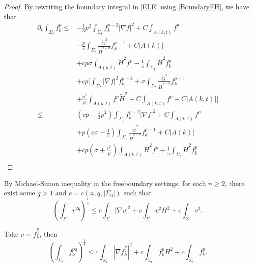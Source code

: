 \begin{proof}
    By rewriting the boundary integral in \autoref{ELE} using \autoref{BoundaryFH}, we have that
    \begin{equation}
        \begin{split}
            \partial_t \int_{\Sigma_t} f_k^p
        \leq &  -\frac{1}{3}p^2 \int_{\Sigma_t} f_{k}^{p-2}\left| \nabla f \right| ^2+C \int_{A(k,t)} f^p  \\
        &-\frac{p}{c} \int_{\Sigma_t} \frac{\tilde{G}^2}{\tilde{H}^{2-\sigma }}f_{k}^{p-1}+C \left| A(k) \right|\\
        &+cp \sigma \int_{A(k,t)}^{}\tilde{H}^2f^p-\frac{1}{5}\int_{\Sigma_t} \tilde{H}^2f_{k}^{p} \\
        &+cp \bigg[  \int_{\Sigma_t} \left| \nabla f \right| ^2 f_{k}^{p-2} + \sigma \int_{\Sigma_t} \frac{\tilde{G}^{2} }{\tilde{H}^{2-\sigma } } f_{k}^{p-1} \\
        &+ \frac{p^2}{\mu }\int_{A(k,t)}^{}f^p \tilde{H}^{2} + C \int_{A(k,t)}^{}f^p + C \left| A(k,t) \right|\bigg]\\
        \leq & \left( cp-\frac{1}{3}p^2 \right) \int_{\Sigma_t} f_{k}^{p-2}\left| \nabla f \right| ^2+C \int_{A(k,t)} f^p  \\
        &+ p\left( c\sigma - \frac{1}{c} \right) \int_{\Sigma_t} \frac{\tilde{G}^2}{\tilde{H}^{2-\sigma }}f_{k}^{p-1}+C \left| A(k) \right|\\
        &+ cp\left(  \sigma + \frac{p^2}{\mu } \right) \int_{A(k,t)}^{}\tilde{H}^2f^p-\frac{1}{5}\int_{\Sigma_t} \tilde{H}^2f_{k}^{p}\\
        \end{split}
        \end{equation}
\end{proof}

By Michael-Simon inequality in the freeboundary settings, for each $n \geq 2$, there exist some $q>1$ and $c=c(n,q,\left| \Sigma_0 \right| )$ such that
\[\left( \int_{\Sigma} v^{2q} \right) ^{\frac{1}{q}} \leq c \int_{\Sigma} \left| \nabla v \right| ^2 + c \int_{\Sigma} v^2 H^2 + c \int_{\Sigma} v^2.\]

Take $v=f_{k}^{\frac{p}{2}} $, then
\begin{equation} \label{MSF}
    \left(\int_{\Sigma_t} f_{k}^{pq} \right) ^{\frac{1}{q}} \leq c \int_{\Sigma_t} \left| \nabla f_{k}^{\frac{p}{2}} \right| ^2 + c \int_{\Sigma_t} f_{k}^{p} H^2 + c \int_{\Sigma_t} f_{k}^{p}.
\end{equation}

